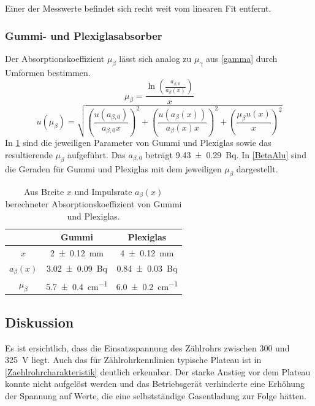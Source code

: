 \documentclass[
	a4paper,
	12pt,
	pagesize,
	ngerman
]{scrartcl}
\begin{document}
	Einer der Messwerte befindet sich recht weit vom linearen Fit entfernt.
	
	\subsubsection*{Gummi- und Plexiglasabsorber} 
	Der Absorptionskoeffizient $\mu_\beta$ lässt sich analog zu $\mu_\gamma$ aus \cref{gamma} durch Umformen bestimmen.
	\begin{equation}
		\mu_\beta = \frac{\ln \left( \frac{a_{\beta,0}}{a_\beta(x)}\right)}{x}
	\end{equation}
	\begin{equation}
	u(\mu_\beta) = \sqrt{ \left(\frac{u(a_{\beta,0})}{a_{\beta,0}x}\right)^2 + \left(\frac{u(a_\beta(x))}{a_\beta(x)x}\right)^2 + \left(\frac{\mu_\beta u(x)}{x}\right)^2}
	\end{equation}
	In \cref{TabelleMu} sind die jeweiligen Parameter von Gummi und Plexiglas sowie das resultierende $\mu_\beta$ aufgeführt.
	Das $a_{\beta,0}$ beträgt \SI{9,43 +- 0,29}{Bq}.
	In \cref{BetaAlu} sind die Geraden für Gummi und Plexiglas mit dem jeweiligen $\mu_\beta$ dargestellt.
	\begin{table}[H]
		\centering
		\begin{tabular}{ c | c | c }
			&Gummi & Plexiglas \\ \hline
			$x$&\SI{2+-0,12}{mm}&\SI{4+-0,12}{mm}\\
			$a_\beta(x)$&\SI{3,02+-0,09}{Bq}&\SI{0,84+-0,03}{Bq}\\
			$\mu_\beta$&\SI{5,7+-0,4}{cm^{-1}}&\SI{6,0+-0,2}{cm^{-1}}\\
			
		\end{tabular}
		\caption{Aus Breite $x$ und Impulsrate $a_\beta(x)$ berechneter Absorptionskoeffizient von Gummi und Plexiglas.}
		\label{TabelleMu} 
	\end{table}
	
	\subsection{Diskussion}
	Es ist ersichtlich, dass die Einsatzspannung des Zählrohrs zwischen 300 und \SI{325}{V} liegt. %
	Auch das für Zählrohrkennlinien typische Plateau ist in \cref{Zaehlrohrcharakteristik} deutlich erkennbar.
	Der starke Anstieg vor dem Plateau konnte nicht aufgelöst werden und das Betriebsgerät verhinderte eine Erhöhung der Spannung auf Werte, die eine selbstständige Gasentladung zur Folge hätten.
	
\end{document}
